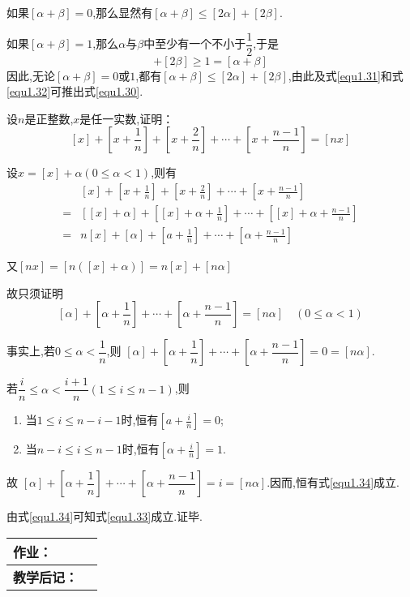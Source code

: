 如果$[\alpha+\beta]=0$,那么显然有$[\alpha+\beta] \leqslant[2 \alpha]+[2 \beta]$.

如果$[\alpha+\beta]=1$,那么$\alpha$与$\beta$中至少有一个不小于$\dfrac{1}{2}$,于是
\begin{equation*}
	[2 \alpha]+[2 \beta] \geqslant 1=[\alpha+\beta]
\end{equation*}
因此,无论$[\alpha+\beta]=0$或$1$,都有$[\alpha+\beta] \leqslant[2 \alpha]+[2 \beta]$,由此及式\eqref{equ1.31}和式\eqref{equ1.32}可推出式\eqref{equ1.30}.

\example 设$n$是正整数,$x$是任一实数,证明：
\begin{equation}\label{equ1.33}
	[x]+\left[x+\frac{1}{n}\right]+\left[x+\frac{2}{n}\right]+\cdots+\left[x+\frac{n-1}{n}\right]=[n x]
\end{equation}

\solve 设$x=[x]+\alpha(0 \leqslant \alpha<1)$,则有
\begin{equation*}
	\begin{split}
		&[x]+\left[x+\frac{1}{n}\right]+\left[x+\frac{2}{n}\right]+\cdots+\left[x+\frac{n-1}{n}\right] \\
		=&[[x]+\alpha]+\left[[x]+\alpha+\frac{1}{n}\right]+\cdots+\left[[x]+\alpha+\frac{n-1}{n}\right] \\
		=&n[x]+[\alpha]+\left[a+\frac{1}{n}\right]+\cdots+\left[\alpha+\frac{n-1}{n}\right]
	\end{split}
\end{equation*}

又$[n x]=[n([x]+\alpha)]=n[x]+[n \alpha]$

故只须证明
\begin{equation}\label{equ1.34}
	[\alpha]+\left[\alpha+\frac{1}{n}\right]+\cdots+\left[\alpha+\frac{n-1}{n}\right]=[n \alpha] \quad(0 \leqslant \alpha<1)
\end{equation}

事实上,若$0 \leqslant \alpha<\dfrac{1}{n}$,则 $[\alpha]+\left[\alpha+\dfrac{1}{n}\right]+\cdots+\left[\alpha+\dfrac{n-1}{n}\right]=0=[n \alpha]$.

若$\dfrac{i}{n} \leqslant \alpha<\dfrac{i+1}{n}(1 \leqslant i \leqslant n-1)$,则
\begin{enumerate}[itemindent=2em]
	\item[\ding{172}] 当$1 \leqslant i \leqslant n-i-1$时,恒有$\left[a+\frac{i}{n}\right]=0$;
	\item[\ding{173}] 当$n-i \leqslant i \leqslant n-1$时,恒有$\left[\alpha+\frac{i}{n}\right]=1$.
\end{enumerate}

故 $[\alpha]+\left[\alpha+\dfrac{1}{n}\right]+\cdots+\left[\alpha+\dfrac{n-1}{n}\right]=i=[n \alpha]$.因而,恒有式\eqref{equ1.34}成立.

由式\eqref{equ1.34}可知式\eqref{equ1.33}成立.证毕.

\begin{table}[htb]
	\centering  
	\begin{tabular}{p{22mm}|p{105.6mm}}
		\hline 
		\textbf{作业：}      &   \\ \hline
		\textbf{教学后记：}  & \vspace{4ex} \\ \hline
	\end{tabular}
\end{table}

